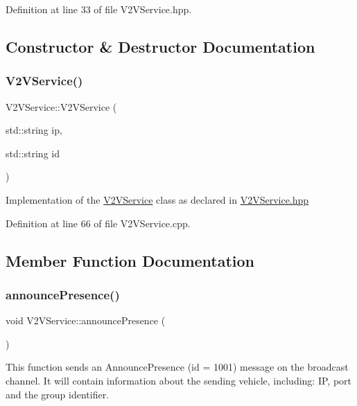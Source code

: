 Definition at line 33 of file V2\+V\+Service.\+hpp.



\subsection{Constructor \& Destructor Documentation}
\mbox{\label{class_v2_v_service_a6a49f9bf68deddd2a786ac7fa4d4f55c}} 
\subsubsection{\texorpdfstring{V2\+V\+Service()}{V2VService()}}
{\footnotesize\ttfamily V2\+V\+Service\+::\+V2\+V\+Service (\begin{DoxyParamCaption}\item[{std\+::string}]{ip,  }\item[{std\+::string}]{id }\end{DoxyParamCaption})}

Implementation of the \mbox{\hyperlink{class_v2_v_service}{V2\+V\+Service}} class as declared in \mbox{\hyperlink{_v2_v_service_8hpp_source}{V2\+V\+Service.\+hpp}} 

Definition at line 66 of file V2\+V\+Service.\+cpp.



\subsection{Member Function Documentation}
\mbox{\label{class_v2_v_service_a1e2f575ac83bebcda2c557d425b3050f}} 
\subsubsection{\texorpdfstring{announce\+Presence()}{announcePresence()}}
{\footnotesize\ttfamily void V2\+V\+Service\+::announce\+Presence (\begin{DoxyParamCaption}{ }\end{DoxyParamCaption})}

This function sends an Announce\+Presence (id = 1001) message on the broadcast channel. It will contain information about the sending vehicle, including\+: IP, port and the group identifier. 

